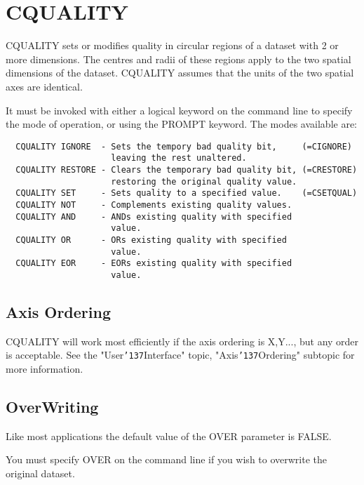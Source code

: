 \documentclass{book}
\renewcommand{\_}{{\tt\char'137}}     %
\begin{document}
\section{CQUALITY}
CQUALITY sets or modifies quality in circular regions of a dataset
with 2 or more dimensions. The centres and radii of these regions
apply to the two spatial dimensions of the dataset. CQUALITY assumes
that the units of the two spatial axes are identical.

It must be invoked with either a logical keyword on the command line
to specify the mode of operation, or using the PROMPT keyword. The
modes available are:
\begin{verbatim}
  CQUALITY IGNORE  - Sets the tempory bad quality bit,     (=CIGNORE)
                     leaving the rest unaltered.
  CQUALITY RESTORE - Clears the temporary bad quality bit, (=CRESTORE)
                     restoring the original quality value.
  CQUALITY SET     - Sets quality to a specified value.    (=CSETQUAL)
  CQUALITY NOT     - Complements existing quality values.
  CQUALITY AND     - ANDs existing quality with specified
                     value.
  CQUALITY OR      - ORs existing quality with specified
                     value.
  CQUALITY EOR     - EORs existing quality with specified
                     value.
\end{verbatim}
\subsection{Axis Ordering}
CQUALITY will work most efficiently if the axis ordering is X,Y...,
but any order is acceptable. See the "User\_Interface" topic,
"Axis\_Ordering" subtopic for more information.

\subsection{OverWriting}
Like most applications the default value of the OVER
parameter is FALSE.

You must specify OVER on the command line if you wish to
overwrite the original dataset.
\end{document}
